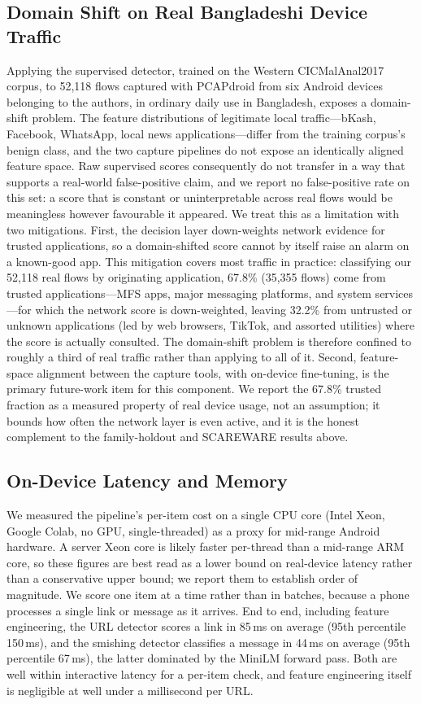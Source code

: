 \documentclass[preprint,12pt,number]{elsarticle}
\begin{document}
\subsection{Domain Shift on Real Bangladeshi Device Traffic}
Applying the supervised detector, trained on the Western CICMalAnal2017 corpus, to 52{,}118 flows captured with PCAPdroid from six Android devices belonging to the authors, in ordinary daily use in Bangladesh, exposes a domain-shift problem. The feature distributions of legitimate local traffic---bKash, Facebook, WhatsApp, local news applications---differ from the training corpus's benign class, and the two capture pipelines do not expose an identically aligned feature space. Raw supervised scores consequently do not transfer in a way that supports a real-world false-positive claim, and we report no false-positive rate on this set: a score that is constant or uninterpretable across real flows would be meaningless however favourable it appeared. We treat this as a limitation with two mitigations. First, the decision layer down-weights network evidence for trusted applications, so a domain-shifted score cannot by itself raise an alarm on a known-good app. This mitigation covers most traffic in practice: classifying our 52{,}118 real flows by originating application, 67.8\% (35{,}355 flows) come from trusted applications---MFS apps, major messaging platforms, and system services---for which the network score is down-weighted, leaving 32.2\% from untrusted or unknown applications (led by web browsers, TikTok, and assorted utilities) where the score is actually consulted. The domain-shift problem is therefore confined to roughly a third of real traffic rather than applying to all of it. Second, feature-space alignment between the capture tools, with on-device fine-tuning, is the primary future-work item for this component. We report the 67.8\% trusted fraction as a measured property of real device usage, not an assumption; it bounds how often the network layer is even active, and it is the honest complement to the family-holdout and SCAREWARE results above.

\subsection{On-Device Latency and Memory}
We measured the pipeline's per-item cost on a single CPU core (Intel Xeon, Google Colab, no GPU, single-threaded) as a proxy for mid-range Android hardware. A server Xeon core is likely faster per-thread than a mid-range ARM core, so these figures are best read as a lower bound on real-device latency rather than a conservative upper bound; we report them to establish order of magnitude. We score one item at a time rather than in batches, because a phone processes a single link or message as it arrives. End to end, including feature engineering, the URL detector scores a link in 85\,ms on average (95th percentile 150\,ms), and the smishing detector classifies a message in 44\,ms on average (95th percentile 67\,ms), the latter dominated by the MiniLM forward pass. Both are well within interactive latency for a per-item check, and feature engineering itself is negligible at well under a millisecond per URL.
\end{document}
